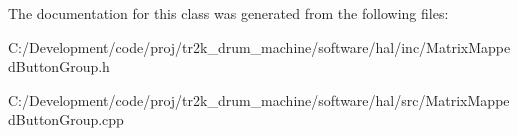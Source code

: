 The documentation for this class was generated from the following files\+:\begin{DoxyCompactItemize}
\item 
C\+:/\+Development/code/proj/tr2k\+\_\+drum\+\_\+machine/software/hal/inc/Matrix\+Mapped\+Button\+Group.\+h\item 
C\+:/\+Development/code/proj/tr2k\+\_\+drum\+\_\+machine/software/hal/src/Matrix\+Mapped\+Button\+Group.\+cpp\end{DoxyCompactItemize}
